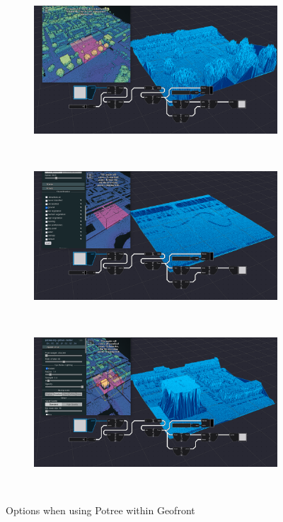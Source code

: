 \begin{figure}
  \centering
  \begin{subfigure}[b]{0.90\linewidth}
    \centering
    \includegraphics[width=\linewidth]{potree-2.PNG}
    \caption{}\label{fig:potree:a}
  \end{subfigure}%
  \\
  \begin{subfigure}[b]{0.90\linewidth}
    \centering
    \includegraphics[width=\linewidth]{potree-4.PNG}
    \caption{}\label{fig:potree:b}
  \end{subfigure}%
  \\
  \begin{subfigure}[b]{0.90\linewidth}
    \centering
    \includegraphics[width=\linewidth]{potree-5.PNG}
    \caption{}\label{fig:potree:c}
  \end{subfigure}%
  \\
  \caption[]{Options when using Potree within Geofront}%
  \label{fig:potree}
\end{figure}

